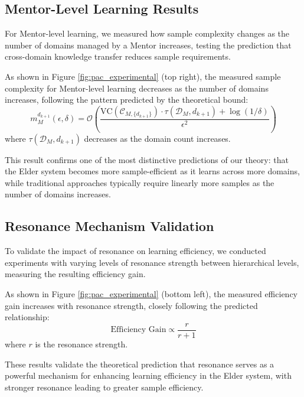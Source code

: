 \subsection{Mentor-Level Learning Results}

For Mentor-level learning, we measured how sample complexity changes as the number of domains managed by a Mentor increases, testing the prediction that cross-domain knowledge transfer reduces sample requirements.

\begin{result}
As shown in Figure \ref{fig:pac_experimental} (top right), the measured sample complexity for Mentor-level learning decreases as the number of domains increases, following the pattern predicted by the theoretical bound:
\begin{equation}
m_{M}^{d_{k+1}}(\epsilon, \delta) = \mathcal{O}\left(\frac{\text{VC}(\mathcal{C}_{M,\{d_{k+1}\}}) \cdot \tau(\mathcal{D}_M, d_{k+1}) + \log(1/\delta)}{\epsilon^2}\right)
\end{equation}
where $\tau(\mathcal{D}_M, d_{k+1})$ decreases as the domain count increases.
\end{result}

This result confirms one of the most distinctive predictions of our theory: that the Elder system becomes more sample-efficient as it learns across more domains, while traditional approaches typically require linearly more samples as the number of domains increases.

\subsection{Resonance Mechanism Validation}

To validate the impact of resonance on learning efficiency, we conducted experiments with varying levels of resonance strength between hierarchical levels, measuring the resulting efficiency gain.

\begin{result}
As shown in Figure \ref{fig:pac_experimental} (bottom left), the measured efficiency gain increases with resonance strength, closely following the predicted relationship:
\begin{equation}
\text{Efficiency Gain} \propto \frac{r}{r + 1}
\end{equation}
where $r$ is the resonance strength.
\end{result}

These results validate the theoretical prediction that resonance serves as a powerful mechanism for enhancing learning efficiency in the Elder system, with stronger resonance leading to greater sample efficiency.

